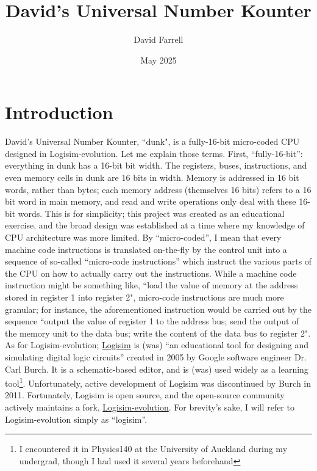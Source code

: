 \documentclass{article}
\title{David's Universal Number Kounter}
\author{David Farrell}
\date{May 2025}
\begin{document}
\maketitle

\section{Introduction}

David's Universal Number Kounter, ``dunk", is a fully-16-bit micro-coded CPU designed in Logisim-evolution. Let me explain those terms. First, ``fully-16-bit'': everything in dunk has a 16-bit bit width. The registers, buses, instructions, and even memory cells in dunk are 16 bits in width. Memory is addressed in 16 bit words, rather than bytes; each memory address (themselves 16 bits) refers to a 16 bit word in main memory, and read and write operations only deal with these 16-bit words. This is for simplicity; this project was created as an educational exercise, and the broad design was established at a time where my knowledge of CPU architecture was more limited. By ``micro-coded'', I mean that every machine code instructions is translated on-the-fly by the control unit into a sequence of so-called ``micro-code instructions'' which instruct the various parts of the CPU on how to actually carry out the instructions. While a machine code instruction might be something like, ``load the value of memory at the address stored in register 1 into register 2", micro-code instructions are much more granular; for instance, the aforementioned instruction would be carried out by the sequence ``output the value of register 1 to the address bus; send the output of the memory unit to the data bus; write the content of the data bus to register 2". As for Logisim-evolution; \href{https://cburch.com/logisim/docs/2.0b17/index.html}{Logisim} is (was) ``an educational tool for designing and simulating digital logic circuits'' created in 2005 by Google software engineer Dr. Carl Burch. It is a schematic-based editor, and is (was) used widely as a learning tool\footnote{I encountered it in Physics140 at the University of Auckland during my undergrad, though I had used it several years beforehand}. Unfortunately, active development of Logisim was discontinued by Burch in 2011. Fortunately, Logisim is open source, and the open-source community actively maintains a fork, \href{https://github.com/logisim-evolution/logisim-evolution}{Logisim-evolution}. For brevity's sake, I will refer to Logisim-evolution simply as ``logisim''.
\end{document}
